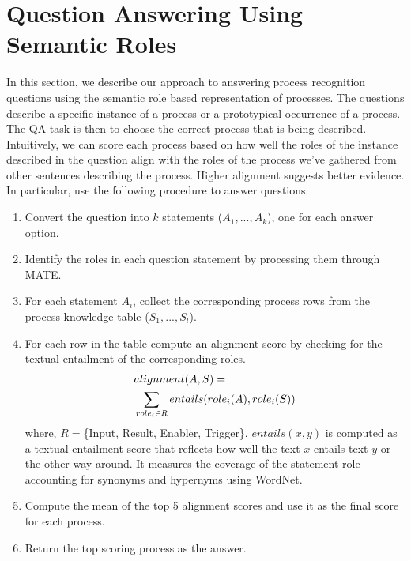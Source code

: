 \section{Question Answering Using Semantic Roles}
\label{sec:qa}
In this section, we describe our approach to answering process recognition questions using the semantic role based representation of processes.
The questions describe a specific instance of a process or a prototypical occurrence of a process. 
The QA task is then to choose the correct process that is being described. 
Intuitively, we can score each process based on how well the roles of the instance described in the question align with the roles of the process we've gathered from other sentences describing the process. 
Higher alignment suggests better evidence. 
In particular, use the following procedure to answer questions:\\
\begin{enumerate}
\item Convert the question into $k$ statements (${A_1, ..., A_k}$), one for each answer option. 
\item Identify the roles in each question statement by processing them through MATE. 
\item For each statement $A_i$, collect the corresponding process rows from the process knowledge table ($S_1, ..., S_l$). 
\item For each row in the table compute an alignment score by checking for the textual entailment of the corresponding roles. 
\begin{align*}
\vspace{-2em}
&alignment(A, S) = \\
& \sum_{role_i \in R} entails(role_i(A), role_i(S))
\vspace{-2em}
\end{align*}
where, $R =$\{Input, Result, Enabler, Trigger\}. $entails(x, y)$ is computed as a textual entailment score that reflects how well the text $x$ entails text $y$ or the other way around. It measures the coverage of the statement role accounting for synonyms and hypernyms using WordNet. 
\item Compute the mean of the top 5 alignment scores and use it as the final score for each process. 
\item Return the top scoring process as the answer.
\end{enumerate}



